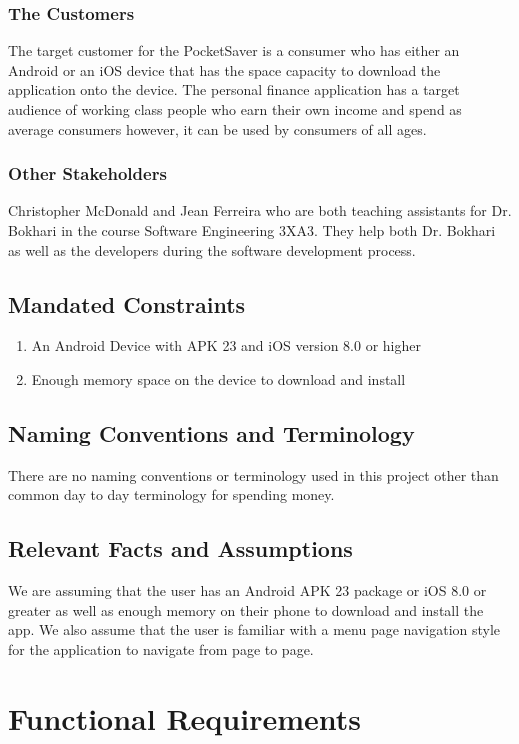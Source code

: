 \documentclass[12pt, titlepage]{article}
\begin{document}
\subsubsection{The Customers}
The target customer for the PocketSaver is a consumer who has either an Android or an iOS device that has the space capacity to download the application onto the device. The personal finance application has a target audience of working class people who earn their own income and spend as average consumers however, it can be used by consumers of all ages.
\subsubsection{Other Stakeholders}
Christopher McDonald and Jean Ferreira who are both teaching assistants for Dr. Bokhari in the course Software Engineering 3XA3. They help both Dr. Bokhari as well as the developers during the software development process.
\subsection{Mandated Constraints}
   \begin{enumerate}
     \item An Android Device with APK 23 and iOS version 8.0 or higher 
     \item Enough memory space on the device to download and install
   \end{enumerate}
\subsection{Naming Conventions and Terminology}
There are no naming conventions or terminology used in this project other than common day to day terminology for spending money. 
\subsection{Relevant Facts and Assumptions}
We are assuming that the user has an Android APK 23 package or iOS 8.0 or greater as well as enough memory on their phone to download and install the app. We also assume that the user is familiar with a menu page navigation style for the application to navigate from page to page.

\section{Functional Requirements}
\end{document}
